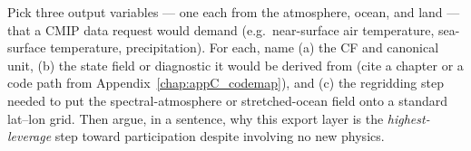 \begin{exercise}
Pick three output variables --- one each from the atmosphere, ocean, and land ---
that a CMIP data request would demand (e.g.\ near-surface air temperature,
sea-surface temperature, precipitation). For each, name (a) the CF
 and canonical unit, (b) the \model{} state field or
diagnostic it would be derived from (cite a chapter or a code path from
Appendix~\ref{chap:appC_codemap}), and (c) the regridding step needed to put the
spectral-atmosphere or stretched-ocean field onto a standard lat--lon grid. Then
argue, in a sentence, why this export layer is the \emph{highest-leverage} step
toward participation despite involving no new physics.
\end{exercise}
